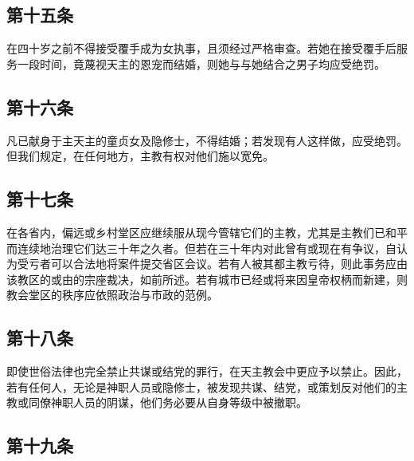 \subsection{第十五条}

在四十岁之前不得接受覆手成为女执事，且须经过严格审查。若她在接受覆手后服务一段时间，竟蔑视天主的恩宠而结婚，则她与与她结合之男子均应受绝罚。\par


\subsection{第十六条}

凡已献身于主天主的童贞女及隐修士，不得结婚；若发现有人这样做，应受绝罚。但我们规定，在任何地方，主教有权对他们施以宽免。\par


\subsection{第十七条}

在各省内，偏远或乡村堂区应继续服从现今管辖它们的主教，尤其是主教们已和平而连续地治理它们达三十年之久者。但若在三十年内对此曾有或现在有争议，自认为受亏者可以合法地将案件提交省区会议。若有人被其都主教亏待，则此事务应由该教区的或由的宗座裁决，如前所述。若有城市已经或将来因皇帝权柄而新建，则教会堂区的秩序应依照政治与市政的范例。\par


\subsection{第十八条}

即使世俗法律也完全禁止共谋或结党的罪行，在天主教会中更应予以禁止。因此，若有任何人，无论是神职人员或隐修士，被发现共谋、结党，或策划反对他们的主教或同僚神职人员的阴谋，他们务必要从自身等级中被撤职。\par


\subsection{第十九条}

